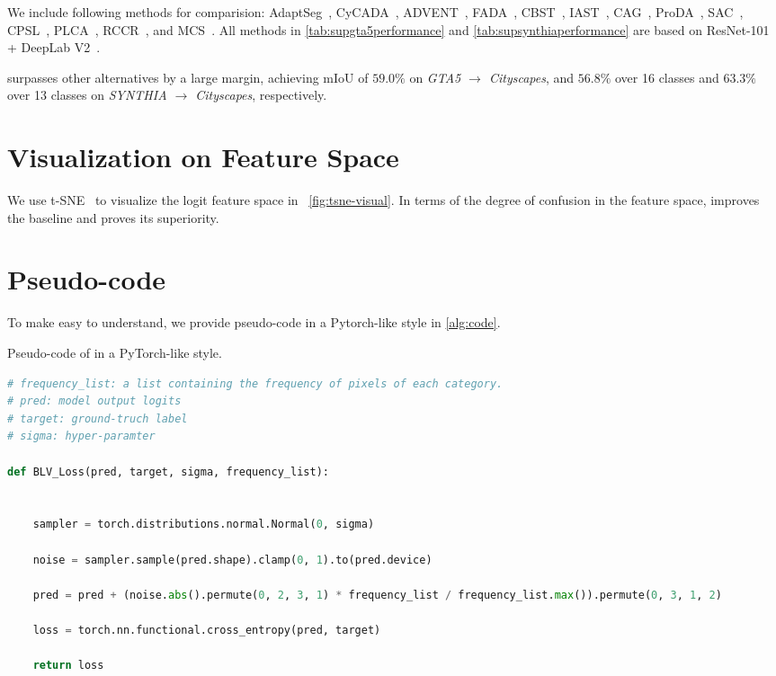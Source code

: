 We include following methods for comparision: AdaptSeg~\cite{tsai2018learning}, CyCADA~\cite{hoffman2018cycada},  ADVENT~\cite{vu2019advent}, FADA~\cite{wang2020classes}, CBST~\cite{zou2018unsupervised}, IAST~\cite{mei2020instance}, CAG~\cite{zhang2019category}, ProDA~\cite{zhang2021prototypical}, SAC~\cite{araslanov2021self}, CPSL~\cite{li2022class},
PLCA~\cite{kang2020pixel}, RCCR~\cite{zhou2021domain}, and MCS~\cite{chung2022maximizing}.
%
All methods in \cref{tab:supgta5performance} and \cref{tab:supsynthiaperformance} are based on ResNet-101~\cite{he2016deep} + DeepLab V2~\cite{deeplab}.
%


\method surpasses other alternatives by a large margin, achieving mIoU of $59.0\%$ on \textit{GTA5 $\to$ Cityscapes}, and $56.8\%$ over 16 classes and $63.3\%$ over 13 classes on \textit{SYNTHIA $\to$ Cityscapes}, respectively.
%





\section{Visualization on Feature Space} \label{sec-sup:tsne-visual}
We use t-SNE~\cite{van2008visualizing} to visualize the logit feature space in ~\cref{fig:tsne-visual}.
%
In terms of the degree of confusion in the feature space, \method improves the baseline and proves its superiority.


\section{Pseudo-code} \label{sec-sup:pseudo-code}
To make \method easy to understand, we provide pseudo-code in a Pytorch-like style in \cref{alg:code}.
%
\begin{algorithm}[ht]
    \caption{Pseudo-code of \method in a PyTorch-like style.}
    \label{alg:code}
    \begin{lstlisting}[language=python]
# frequency_list: a list containing the frequency of pixels of each category.
# pred: model output logits
# target: ground-truch label
# sigma: hyper-paramter

def BLV_Loss(pred, target, sigma, frequency_list):

    
    sampler = torch.distributions.normal.Normal(0, sigma)

    noise = sampler.sample(pred.shape).clamp(0, 1).to(pred.device)

    pred = pred + (noise.abs().permute(0, 2, 3, 1) * frequency_list / frequency_list.max()).permute(0, 3, 1, 2)

    loss = torch.nn.functional.cross_entropy(pred, target)

    return loss

\end{lstlisting}
\end{algorithm}

